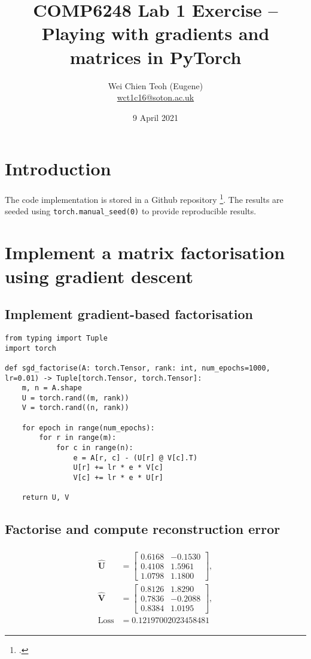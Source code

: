 \documentclass[10pt, twocolumn]{article}
\title{\Large COMP6248 Lab 1 Exercise -- Playing with gradients and matrices in PyTorch}
\author{\small Wei Chien Teoh (Eugene)\\\bigskip \href{mailto:wct1c16@soton.ac.uk}{wct1c16@soton.ac.uk}}
\date{\small 9 April 2021}
\begin{document}
\maketitle

\section*{Introduction}

The code implementation is stored in a Github repository \footcite{github}. The results are seeded using \lstinline{torch.manual_seed(0)} to provide reproducible results.

\section{Implement a matrix factorisation using gradient descent}

\subsection{Implement gradient-based factorisation}

\begin{lstlisting}
from typing import Tuple
import torch

def sgd_factorise(A: torch.Tensor, rank: int, num_epochs=1000, lr=0.01) -> Tuple[torch.Tensor, torch.Tensor]:
    m, n = A.shape
    U = torch.rand((m, rank))
    V = torch.rand((n, rank)) 

    for epoch in range(num_epochs):
        for r in range(m):
            for c in range(n):
                e = A[r, c] - (U[r] @ V[c].T)
                U[r] += lr * e * V[c]
                V[c] += lr * e * U[r]

    return U, V
\end{lstlisting}

\subsection{Factorise and compute reconstruction error} \label{sec:reconstruction}

\begin{align*}
    \begin{split}
    \hat{\pmb{U}} &= 
    \begin{bmatrix}
        0.6168 & -0.1530\\
        0.4108 &  1.5961\\
        1.0798 &  1.1800
    \end{bmatrix},\\
    \hat{\pmb{V}} &= 
    \begin{bmatrix}
        0.8126 &  1.8290\\
        0.7836 & -0.2088\\
        0.8384 & 1.0195
    \end{bmatrix},\\
    \text{Loss} &= 0.12197002023458481
    \end{split}
\end{align*}
\end{document}
